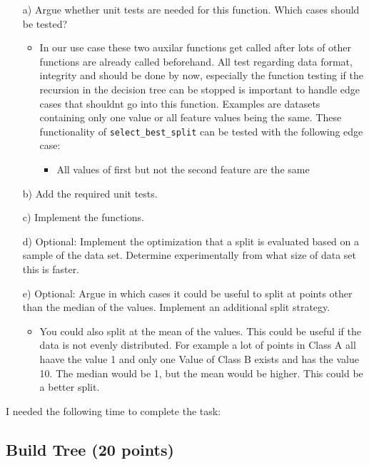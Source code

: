 \documentclass{article}
\begin{document}
\begin{enumerate}

\item[a)] Argue whether unit tests are needed for this function. Which cases should be tested?
\begin{itemize}
    \item In our use case these two auxilar functions get called after lots of other functions are already called beforehand.
    All test regarding data format, integrity and should be done by now, especially the function testing if the recursion in the decision tree can be stopped is important to handle edge cases that shouldnt go into this function.
    Examples are datasets containing only one value or all feature values being the same. These functionality of \texttt{select\_best\_split} can be tested with the following edge case:
    \begin{itemize}
        \item All values of first but not the second feature are the same
    \end{itemize}
\end{itemize}

\item[b)] Add the required unit tests.

\item[c)] Implement the functions.

\item[d)] Optional: Implement the optimization that a split is evaluated based on a sample of the data set. Determine experimentally from what size of data set this is faster.

\item[e)] Optional: Argue in which cases it could be useful to split at points other than the median of the values. Implement an additional split strategy.
\begin{itemize}
    \item You could also split at the mean of the values. This could be useful if the data is not evenly distributed. For example a lot of points in Class A all haave the value 1 and only one Value of Class B exists and has
    the value 10. The median would be 1, but the mean would be higher. This could be a better split.
\end{itemize}

\end{enumerate}

I needed the following time to complete the task:

\subsection{Build Tree (20 points)}
\end{document}
